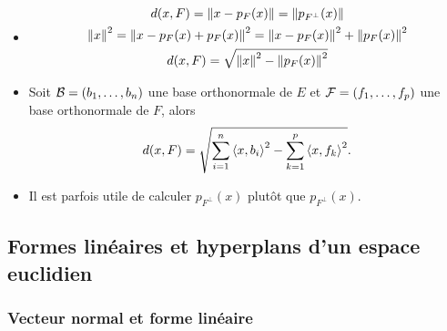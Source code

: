     \begin{itemize}
      \item
        \begin{gather}
          d(x,F) = \left\lVert x-p_F(x)\right\rVert = \left\lVert p_{F^\perp}(x)\right\rVert \\
          \left\lVert x\right\rVert^2 = \left\lVert x-p_F(x)+p_F(x)\right\rVert^2=\left\lVert x-p_F(x)\right\rVert^2+\left\lVert p_F(x)\right\rVert^2\\
          d(x,F) = \sqrt{\left\lVert x\right\rVert^2-\left\lVert p_F(x)\right\rVert^2}
        \end{gather}
      \item Soit \(\mathcal{B}=(b_1,\ldots, b_n)\) une base orthonormale de \(E\) et \(\mathcal{F}=(f_1,\ldots, f_p)\) une base orthonormale de \(F\), alors
        \begin{equation}
          d(x,F) = \sqrt{\sum_{i=1}^n\left\langle{x},{b_i}\right\rangle^2-\sum_{k=1}^p\left\langle{x},{f_k}\right\rangle^2}.
        \end{equation}
      \item Il est parfois utile de calculer \(p_{F^\perp}(x)\) plutôt que \(p_{F^\perp}(x)\).
    \end{itemize}

    \subsection{Formes linéaires et hyperplans d'un espace euclidien}

    \subsubsection{Vecteur normal et forme linéaire}

